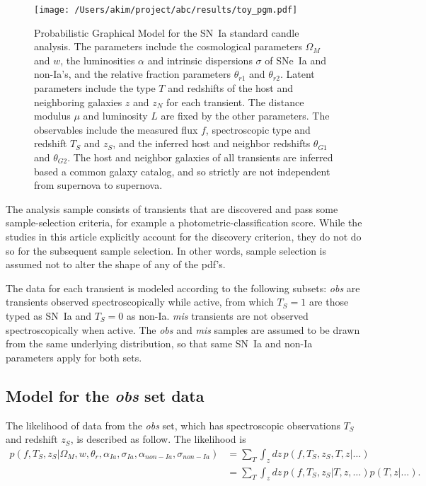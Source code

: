 \documentclass[preprint,3p]{elsarticle}
\begin{document}
\begin{figure}[htbp] %
   \centering
   \texttt{[image: /Users/akim/project/abc/results/toy\_pgm.pdf]} 
   \caption{Probabilistic Graphical Model for the  SN~Ia standard candle analysis. The
   parameters include the cosmological parameters $\Omega_M$ and $w$,
   the luminosities $\alpha$ and intrinsic dispersions $\sigma$ of SNe~Ia and non-Ia's,
   and the relative fraction parameters $\theta_{r1}$ and $\theta_{r2}$.  Latent parameters
   include the type $T$ and redshifts of the host and neighboring galaxies $z$ and $z_N$
   for each transient.  The  distance modulus $\mu$ and
   luminosity $L$ are fixed by the other parameters.  The observables include the measured
   flux $f$, spectroscopic type and redshift $T_S$ and $z_S$, and
   the inferred host and neighbor redshifts $\theta_{G1}$ and $\theta_{G2}$.
   The host and neighbor galaxies of all transients are inferred based a common galaxy catalog, 
   and so strictly are not independent from supernova to supernova.
   \label{toypgm:fig}}
\end{figure}


The analysis sample consists of transients that are discovered and pass some sample-selection criteria, for example a photometric-classification score.  While the studies in this
article  explicitly account for
the discovery criterion, they do not do so for the subsequent sample selection.
In other words, sample selection is assumed not to alter the shape of any of the pdf's.

The data for each transient
is modeled according to the following subsets:
{\it obs} are transients observed spectroscopically while active, from which $T_S=1$ are those typed
as SN~Ia and $T_S=0$ as non-Ia.  {\it mis} transients are not observed
spectroscopically when active.  The  {\it obs} and {\it mis} samples
are assumed to be drawn from the same underlying distribution, so that 
same SN~Ia and non-Ia parameters apply for both sets.

\subsection{Model for the {\it obs} set data}
\label{obs:sec}
The likelihood of data from the {\it obs} set, which has
spectroscopic observations $T_S$ and redshift
$z_S$, is described as follow.  The likelihood is
\begin{align}
p(f, {{T}}_S,{{z}}_S|  \Omega_M, w, \theta_r,\alpha_{Ia},\sigma_{Ia}, \alpha_{\mathit{non-Ia}},\sigma_{\mathit{non-Ia}})  &=\sum_T \int_z dz\,
p(f, {{T}}_S,{{z}}_S, T, z| \ldots)\\
&= \sum_T \int_z dz\,
p(f, {{T}}_S,{{z}}_S| T, z,\dots) p(T,z | \ldots).
\end{align}
\end{document}

